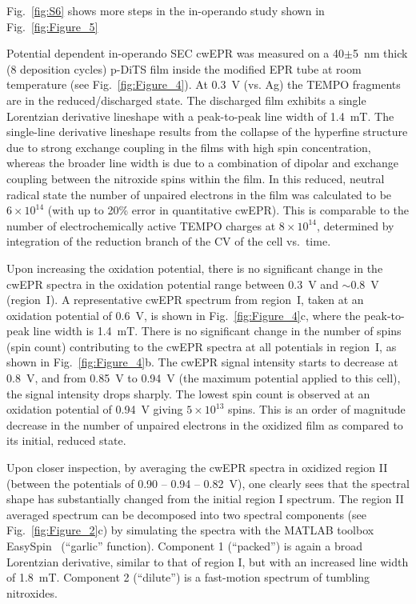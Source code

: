 Fig.~\ref{fig:S6} shows more steps in the in-operando study shown in Fig.~\ref{fig:Figure_5}




Potential dependent in-operando SEC cwEPR was measured on a 40$\pm$5~nm thick (8 deposition cycles) p-DiTS film inside the modified EPR tube at room temperature (see Fig.~\ref{fig:Figure_4}). At 0.3~V (vs. Ag) the TEMPO fragments are in the reduced/discharged state. The discharged film exhibits a single Lorentzian derivative lineshape with a peak-to-peak line width of 1.4~mT. The single-line derivative lineshape results from the collapse of the hyperfine structure due to strong exchange coupling in the films with high spin concentration, whereas the broader line width is due to a combination of dipolar and exchange coupling between the nitroxide spins within the film. In this reduced, neutral radical state the number of unpaired electrons in the film was calculated to be $6\times10^{14}$ (with up to 20\% error in quantitative cwEPR). This is comparable to the number of electrochemically active TEMPO charges at $8\times10^{14}$, determined by integration of the reduction branch of the CV of the cell vs.\ time.
\par
Upon increasing the oxidation potential, there is no significant change in the cwEPR spectra in the oxidation potential range between 0.3~V and $\sim$0.8~V (region~I). A representative cwEPR spectrum from region~I, taken at an oxidation potential of 0.6~V, is shown in Fig.~\ref{fig:Figure_4}c, where the peak-to-peak line width is 1.4~mT. There is no significant change in the number of spins (spin count) contributing to the cwEPR spectra at all potentials in region~I, as shown in Fig.~\ref{fig:Figure_4}b. The cwEPR signal intensity starts to decrease at 0.8~V, and from 0.85~V to 0.94~V (the maximum potential applied to this cell), the signal intensity drops sharply. The lowest spin count is observed at an oxidation potential of 0.94~V giving $5\times10^{13}$ spins. This is an order of magnitude decrease in the number of unpaired electrons in the oxidized film as compared to its initial, reduced state.


\par
Upon closer inspection, by averaging the cwEPR spectra in oxidized region II (between the potentials of 0.90 -- 0.94 -- 0.82~V), one clearly sees that the spectral shape has substantially changed from the initial region I spectrum. The region II averaged spectrum can be decomposed into two spectral components (see Fig.~\ref{fig:Figure_2}c) by simulating the spectra with the MATLAB toolbox EasySpin~\cite{Stoll2006} (``garlic'' function). Component 1 (``packed'') is again a broad Lorentzian derivative, similar to that of region I, but with an increased line width of 1.8~mT. Component 2 (``dilute'') is a fast-motion spectrum of tumbling nitroxides.

